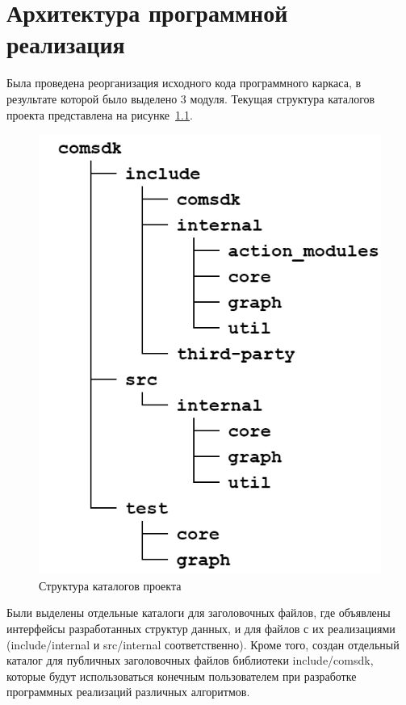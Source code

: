 \chapter{Архитектура программной реализация}\label{chap3_soft_architecture}
Была проведена реорганизация исходного кода программного каркаса, в результате которой было выделено 3 модуля. Текущая структура каталогов проекта представлена на рисунке~\ref{fig:fileStructure}.
\begin{figure}[!ht]
    \centering
    \includegraphics[height=0.35\textheight]{figures/fileStructure.png}
    \caption{Структура каталогов проекта}
    \label{fig:fileStructure}
\end{figure}
Были выделены отдельные каталоги для заголовочных файлов, где объявлены интерфейсы разработанных структур данных, и для файлов с их реализациями (\textsf{include/internal} и \textsf{src/internal} соответственно). Кроме того, создан отдельный каталог для публичных заголовочных файлов библиотеки \textsf{include/comsdk}, которые будут использоваться конечным пользователем при разработке программных реализаций различных алгоритмов.
